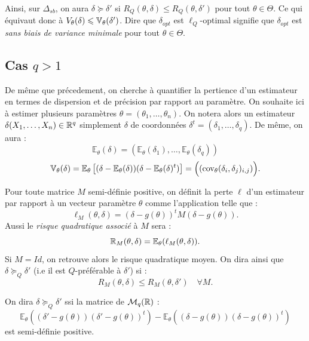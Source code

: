 \begin{proposition}
    Ainsi, sur $ \Delta_{sb}$, on aura $ \delta \succeq \delta'$ si $ R_Q(\theta, \delta) \leqslant R_Q(\theta, \delta')$ pour tout 
    $ \theta \in \Theta$. Ce qui équivaut donc à $ V_\theta( \delta) \leqslant \mathbb{V}_\theta( \delta')$. 
    Dire que $ \delta_{opt}$ est $\ell_Q$-optimal signifie que $ \delta_{opt}$ est \emph{sans biais de variance 
    minimale} pour tout $ \theta \in \Theta$. 
\end{proposition}

\subsection{Cas $q > 1$}

De même que précedement, on cherche à quantifier la pertience d'un estimateur en termes de dispersion 
et de précision par rapport au paramètre. On souhaite ici à estimer plusieurs paramètres 
$ \theta = (\theta_1, \dots, \theta_n)$. On notera alors un estimateur $ \delta(X_1, \dots, X_n) \in \mathbb{R}^q$ simplement 
$ \delta$ de coordonnées $ \delta^t = ( \delta_1, \dots, \delta_q)$. De même, on aura : 
    $$ \mathbb{E}_\theta( \delta) = ( \mathbb{E}_\theta(\delta_1), \dots, \mathbb{E}_\theta(\delta_q)) $$ 
    $$ \mathbb{V}_\theta( \delta) = \mathbb{E}_\theta \left[ (\delta - \mathbb{E}_\theta(\delta))
        ( \delta - \mathbb{E}_\theta(\delta)^t) \right] 
        = \Bigl( (\text{cov}_\theta(\delta_i, \delta_j)_{i,j}) \Bigr).
    $$

\begin{definition}
    Pour toute matrice $M$ semi-définie positive, on définit la perte $\ell$ d'un estimateur par rapport 
    à un vecteur paramètre $ \theta$ comme l'application telle que :
        $$ \ell_M(\theta, \delta) = (\delta - g(\theta))^t M (\delta - g(\theta)). $$
    Aussi le \emph{risque quadratique associé} à $M$ sera : 
        $$ \mathbb{R}_M(\theta, \delta) = \mathbb{E}_\theta(\ell_M(\theta, \delta)). $$
    Si $M = Id$, on retrouve alors le risque quadratique moyen. On dira ainsi que $ \delta \succeq_Q \delta'$ 
    (i.e il est $Q$-préférable à $ \delta'$) si : 
        $$ R_M( \theta, \delta) \leqslant R_M( \theta, \delta') \quad \forall M. $$
\end{definition}

\begin{theorem}[Caractérisation]
    On dira $ \delta \succeq_Q \delta'$ ssi la matrice de $ \mathcal{M}_q(\mathbb{R})$ :
        $$ \boxed{
            \mathbb{E}_\theta(( \delta' - g( \theta)) ( \delta' - g( \theta))^t)
            - \mathbb{E}_\theta(( \delta - g( \theta))( \delta - g( \theta))^t)
        }
        $$
    est semi-définie positive. 
\end{theorem}

